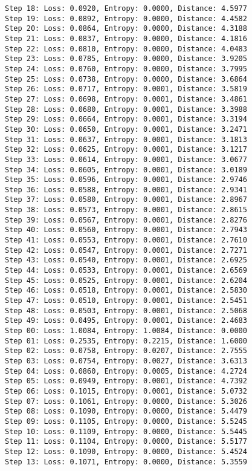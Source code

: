 \documentclass[11pt]{article}
\begin{document}
\begin{Verbatim}[commandchars=\\\{\}]
Step 18: Loss: 0.0920, Entropy: 0.0000, Distance: 4.5977
Step 19: Loss: 0.0892, Entropy: 0.0000, Distance: 4.4582
Step 20: Loss: 0.0864, Entropy: 0.0000, Distance: 4.3188
Step 21: Loss: 0.0837, Entropy: 0.0000, Distance: 4.1816
Step 22: Loss: 0.0810, Entropy: 0.0000, Distance: 4.0483
Step 23: Loss: 0.0785, Entropy: 0.0000, Distance: 3.9205
Step 24: Loss: 0.0760, Entropy: 0.0000, Distance: 3.7995
Step 25: Loss: 0.0738, Entropy: 0.0000, Distance: 3.6864
Step 26: Loss: 0.0717, Entropy: 0.0001, Distance: 3.5819
Step 27: Loss: 0.0698, Entropy: 0.0001, Distance: 3.4861
Step 28: Loss: 0.0680, Entropy: 0.0001, Distance: 3.3988
Step 29: Loss: 0.0664, Entropy: 0.0001, Distance: 3.3194
Step 30: Loss: 0.0650, Entropy: 0.0001, Distance: 3.2471
Step 31: Loss: 0.0637, Entropy: 0.0001, Distance: 3.1813
Step 32: Loss: 0.0625, Entropy: 0.0001, Distance: 3.1217
Step 33: Loss: 0.0614, Entropy: 0.0001, Distance: 3.0677
Step 34: Loss: 0.0605, Entropy: 0.0001, Distance: 3.0189
Step 35: Loss: 0.0596, Entropy: 0.0001, Distance: 2.9746
Step 36: Loss: 0.0588, Entropy: 0.0001, Distance: 2.9341
Step 37: Loss: 0.0580, Entropy: 0.0001, Distance: 2.8967
Step 38: Loss: 0.0573, Entropy: 0.0001, Distance: 2.8615
Step 39: Loss: 0.0567, Entropy: 0.0001, Distance: 2.8276
Step 40: Loss: 0.0560, Entropy: 0.0001, Distance: 2.7943
Step 41: Loss: 0.0553, Entropy: 0.0001, Distance: 2.7610
Step 42: Loss: 0.0547, Entropy: 0.0001, Distance: 2.7271
Step 43: Loss: 0.0540, Entropy: 0.0001, Distance: 2.6925
Step 44: Loss: 0.0533, Entropy: 0.0001, Distance: 2.6569
Step 45: Loss: 0.0525, Entropy: 0.0001, Distance: 2.6204
Step 46: Loss: 0.0518, Entropy: 0.0001, Distance: 2.5830
Step 47: Loss: 0.0510, Entropy: 0.0001, Distance: 2.5451
Step 48: Loss: 0.0503, Entropy: 0.0001, Distance: 2.5068
Step 49: Loss: 0.0495, Entropy: 0.0001, Distance: 2.4683
Step 00: Loss: 1.0084, Entropy: 1.0084, Distance: 0.0000
Step 01: Loss: 0.2535, Entropy: 0.2215, Distance: 1.6000
Step 02: Loss: 0.0758, Entropy: 0.0207, Distance: 2.7555
Step 03: Loss: 0.0754, Entropy: 0.0027, Distance: 3.6313
Step 04: Loss: 0.0860, Entropy: 0.0005, Distance: 4.2724
Step 05: Loss: 0.0949, Entropy: 0.0001, Distance: 4.7392
Step 06: Loss: 0.1015, Entropy: 0.0001, Distance: 5.0732
Step 07: Loss: 0.1061, Entropy: 0.0000, Distance: 5.3026
Step 08: Loss: 0.1090, Entropy: 0.0000, Distance: 5.4479
Step 09: Loss: 0.1105, Entropy: 0.0000, Distance: 5.5245
Step 10: Loss: 0.1109, Entropy: 0.0000, Distance: 5.5445
Step 11: Loss: 0.1104, Entropy: 0.0000, Distance: 5.5177
Step 12: Loss: 0.1090, Entropy: 0.0000, Distance: 5.4524
Step 13: Loss: 0.1071, Entropy: 0.0000, Distance: 5.3559

\end{Verbatim}
\end{document}

